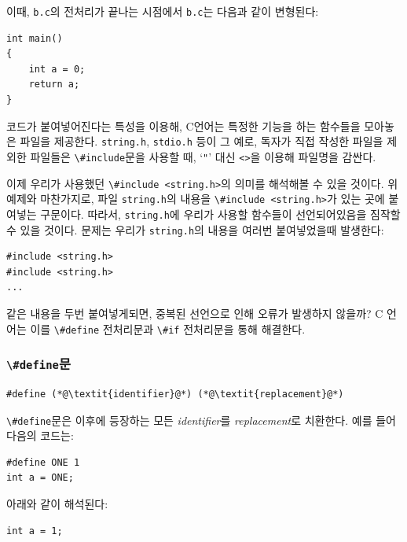 \documentclass[a4paper,12pt]{book}
\newcommand{\V}[1]{\Verb|#1|}
\begin{document}
        이때, \V{b.c}의 전처리가 끝나는 시점에서 \V{b.c}는 다음과 같이 변형된다:

        \begin{lstlisting}
int main()
{
    int a = 0;
    return a;
}
        \end{lstlisting}

        코드가 붙여넣어진다는 특성을 이용해,
        C언어는 특정한 기능을 하는 함수들을 모아놓은 파일을 제공한다.
        \V{string.h}, \V{stdio.h} 등이 그 예로,
        독자가 직접 작성한 파일을 제외한 파일들은 \V{\#include}문을 사용할 때,
        `\V{"}' 대신 \V{<>}을 이용해 파일명을 감싼다.

        이제 우리가 사용했던 \V{\#include <string.h>}의 의미를 해석해볼 수 있을 것이다.
        위 예제와 마찬가지로, 파일 \V{string.h}의 내용을 \V{\#include <string.h>}가 있는 곳에 붙여넣는 구문이다.
        따라서, \V{string.h}에 우리가 사용할 함수들이 선언되어있음을 짐작할 수 있을 것이다.
        문제는 우리가 \V{string.h}의 내용을 여러번 붙여넣었을때 발생한다:

        \begin{lstlisting}
#include <string.h>
#include <string.h>
...
        \end{lstlisting}

        같은 내용을 두번 붙여넣게되면, 중복된 선언으로 인해 오류가 발생하지 않을까?
        C 언어는 이를 \V{\#define} 전처리문과 \V{\#if} 전처리문을 통해 해결한다.

        \subsubsection{\V{\#define}문}

            \begin{lstlisting}  
#define (*@\textit{identifier}@*) (*@\textit{replacement}@*)
            \end{lstlisting}

            \V{\#define}문은 이후에 등장하는 모든 \textit{identifier}를 \textit{replacement}로 치환한다.
            예를 들어 다음의 코드는:

            \begin{lstlisting}
#define ONE 1
int a = ONE;
            \end{lstlisting}

            아래와 같이 해석된다:

            \begin{lstlisting}
int a = 1;
            \end{lstlisting}
\end{document}
